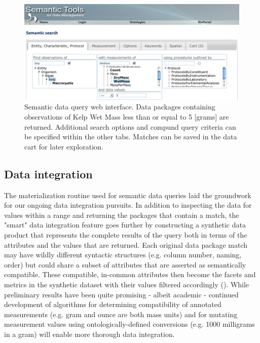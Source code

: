 \begin{figure}[!t]
\centering
\includegraphics[width=1.0\textwidth]{images/metacat-query.png}
\caption{Semantic data query web interface. Data packages containing observations of Kelp Wet Mass less than or equal to 5 [grams] are returned. Additional search options and compund query criteria can be specified within the other tabs. Matches can be saved in the data cart for later exploration.}
\label{fig:metacat-query}
\end{figure}

\subsection{Data integration}
The materialization routine used for semantic data queries laid the groundwork for our ongoing data integration pursuits.
In addition to inspecting the data for values within a range and returning the packages that contain a match, the "smart" data integration feature goes further by constructing a synthetic data product that represents the complete results of the query both in terms of the attributes and the values that are returned. Each original data package match may have wildly different syntactic structures (e.g. column number, naming, order) but could share a subset of attributes that are asserted as semantically compatible. These compatible, in-common attributes then become the facets and metrics in the synthetic dataset with their values filtered accordingly (). While preliminary results have been quite promising - albeit academic - continued development of algorithms for determining compatibility of annotated measurements (e.g. gram and ounce are both mass units) and for mutating measurement values using ontologically-defined conversions (e.g. 1000 milligrams in a gram) will enable more thorough data integration.



